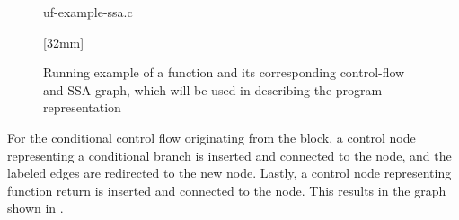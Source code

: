 \begin{figure}
  \centering

                {%
                  \begin{lstpage}{60mm}%
                                    {uf-example-ssa.c}%
                  \end{lstpage}%
                }

  \vspace{\baselineskip}

  \mbox{}%
  \hfill%
                [32mm]%
                {%
                }%
  \hfill\hfill%
                {}
  \hfill%
  \mbox{}

  \caption[Example of function used to describe the program representation]%
          {%
            Running example of a function and its corresponding control-flow and
            SSA graph, which will be used in describing the program
            representation%
          }
\end{figure}%
%
For the conditional control flow originating from the 
\gls{block}, a \gls{control node} representing a conditional branch is inserted
and connected to the  \gls{node}, and the labeled \glspl{edge}
are redirected to the new \gls{node}.
%
Lastly, a \gls{control node} representing \gls{function} return is inserted and
connected to the  \gls{node}.
%
This results in the \gls{graph} shown in
.

